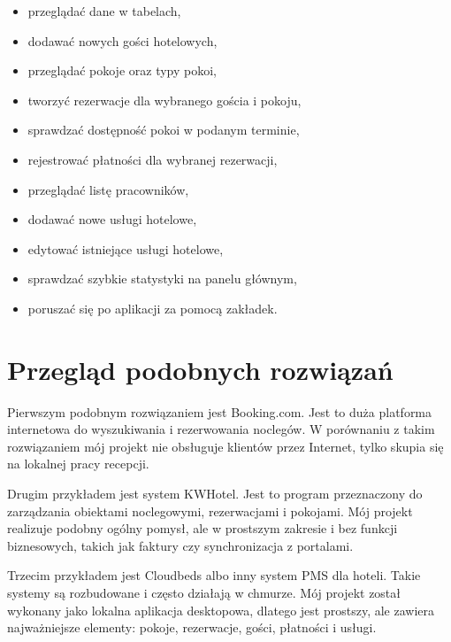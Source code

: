 \begin{itemize}
  \item przeglądać dane w tabelach,
  \item dodawać nowych gości hotelowych,
  \item przeglądać pokoje oraz typy pokoi,
  \item tworzyć rezerwacje dla wybranego gościa i pokoju,
  \item sprawdzać dostępność pokoi w podanym terminie,
  \item rejestrować płatności dla wybranej rezerwacji,
  \item przeglądać listę pracowników,
  \item dodawać nowe usługi hotelowe,
  \item edytować istniejące usługi hotelowe,
  \item sprawdzać szybkie statystyki na panelu głównym,
  \item poruszać się po aplikacji za pomocą zakładek.
\end{itemize}

\section{Przegląd podobnych rozwiązań}

Pierwszym podobnym rozwiązaniem jest Booking.com. Jest to duża platforma internetowa do wyszukiwania i rezerwowania noclegów. W porównaniu z takim rozwiązaniem mój projekt nie obsługuje klientów przez Internet, tylko skupia się na lokalnej pracy recepcji.

Drugim przykładem jest system KWHotel. Jest to program przeznaczony do zarządzania obiektami noclegowymi, rezerwacjami i pokojami. Mój projekt realizuje podobny ogólny pomysł, ale w prostszym zakresie i bez funkcji biznesowych, takich jak faktury czy synchronizacja z portalami.

Trzecim przykładem jest Cloudbeds albo inny system PMS dla hoteli. Takie systemy są rozbudowane i często działają w chmurze. Mój projekt został wykonany jako lokalna aplikacja desktopowa, dlatego jest prostszy, ale zawiera najważniejsze elementy: pokoje, rezerwacje, gości, płatności i usługi.
